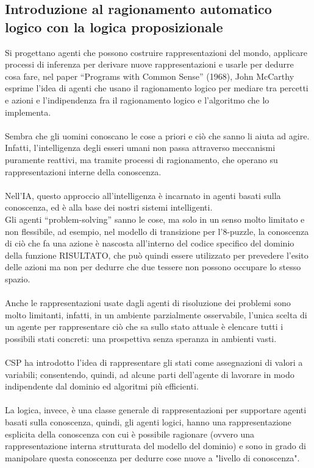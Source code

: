 \documentclass[../main.tex]{subfiles}
\begin{document}
	\subsection{Introduzione al ragionamento automatico logico con la logica proposizionale}
	Si progettano agenti che possono costruire rappresentazioni del mondo, applicare processi di inferenza per derivare nuove rappresentazioni e usarle per dedurre cosa fare, nel paper “Programs with Common Sense” (1968), John McCarthy esprime l’idea di agenti che usano il ragionamento logico per mediare tra percetti e azioni e l’indipendenza fra il ragionamento logico e l’algoritmo che lo implementa.\\\\
	Sembra che gli uomini conoscano le cose a priori e ciò che sanno li aiuta ad agire.\\
	Infatti, l'intelligenza degli esseri umani non passa attraverso meccanismi puramente reattivi, ma tramite processi di ragionamento, che operano su rappresentazioni interne della conoscenza.\\\\
	Nell'IA, questo approccio all'intelligenza è incarnato in agenti basati sulla conoscenza, ed è alla base dei nostri sistemi intelligenti. \\
	Gli agenti “problem-solving” sanno le cose, ma solo in un senso molto limitato e non flessibile, ad esempio, nel modello di transizione per l'8-puzzle, la conoscenza di ciò che fa una azione è nascosta all'interno del codice specifico del dominio della funzione RISULTATO, che può quindi essere utilizzato per prevedere l'esito delle azioni ma non per dedurre che due tessere non possono occupare lo stesso spazio.\\\\
	Anche le rappresentazioni usate dagli agenti di risoluzione dei problemi sono molto limitanti, infatti, in un ambiente parzialmente osservabile, l'unica scelta di un agente per rappresentare ciò che sa sullo stato attuale è elencare tutti i possibili stati concreti: una prospettiva senza speranza in ambienti vasti.\\\\
	CSP ha introdotto l'idea di rappresentare gli stati come assegnazioni di valori a variabili; consentendo, quindi, ad alcune parti dell'agente di lavorare in modo indipendente dal dominio ed algoritmi più efficienti.\\\\
	La logica, invece, è una classe generale di rappresentazioni per supportare agenti basati sulla conoscenza, quindi, gli agenti logici, hanno una rappresentazione esplicita della conoscenza con cui è possibile ragionare (ovvero una rappresentazione interna strutturata del modello del dominio) e sono in grado di manipolare questa conoscenza per dedurre cose nuove a "livello di conoscenza".\\\\
\end{document}
